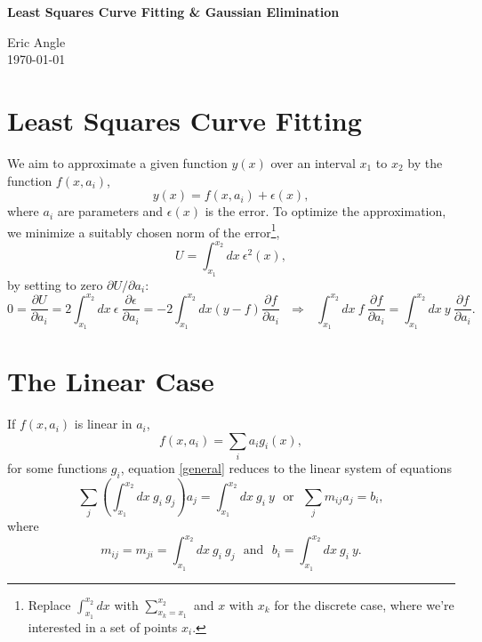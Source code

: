 \documentclass[10pt]{article}
\begin{document}
\begin{center}
{\LARGE \bf Least Squares Curve Fitting \& Gaussian Elimination} \\
\end{center}
\begin{center}
Eric Angle \\
\today
\end{center}

\section{Least Squares Curve Fitting}
\noindent We aim to approximate a given function $y\left(x\right)$ over an interval $x_1$ to $x_2$ by the function $f\left(x,a_i\right)$,
\begin{equation*}
y\left(x\right) = f\left(x,a_i\right) + \epsilon\left(x\right),
\end{equation*}
\noindent where $a_i$ are parameters and $\epsilon\left(x\right)$ is the error. To optimize the approximation, we minimize a suitably chosen norm of the error\footnote{Replace $\int_{x_1}^{x_2} dx$ with $\sum_{x_k = x_1}^{x_2}$ and $x$ with $x_k$ for the discrete case, where we're interested in a set of points $x_i$.},
\begin{equation*}
U = \int_{x_1}^{x_2} dx \ \epsilon^2\left(x\right),
\end{equation*}
\noindent by setting to zero $\partial U / \partial a_i$:
\begin{equation}\label{general}
0 = \frac{\partial U}{\partial a_i} = 2 \int_{x_1}^{x_2} dx \ \epsilon \ \frac{\partial \epsilon}{\partial a_i} = - 2 \int_{x_1}^{x_2} dx \left(y - f\right) \frac{\partial f}{\partial a_i} \ \ \ \Rightarrow \ \ \ \int_{x_1}^{x_2} dx \ f \ \frac{\partial f}{\partial a_i} = \int_{x_1}^{x_2} dx \ y \ \frac{\partial f}{\partial a_i}.
\end{equation}
\section{The Linear Case}
\noindent If $f\left(x, a_i\right)$ is linear in $a_i$, 
\begin{equation}\label{linear}
f\left(x,a_i\right) = \sum_i a_i g_i\left(x\right),
\end{equation}
\noindent for some functions $g_i$, equation \ref{general} reduces to the linear system of equations
\begin{equation*}
\sum_j \left(\int_{x_1}^{x_2} dx \ g_i \ g_j\right) a_j = \int_{x_1}^{x_2} dx \ g_i \ y \ \ \ \mbox{or} \ \ \ \sum_{j} m_{i j} a_j = b_i,
\end{equation*}
\noindent where
\begin{equation}\label{formula}
m_{i j} = m_{j i} = \int_{x_1}^{x_2} dx \ g_i \ g_j \ \ \ \mbox{and} \ \ \ b_i = \int_{x_1}^{x_2} dx \ g_i \ y.
\end{equation}
\end{document}
